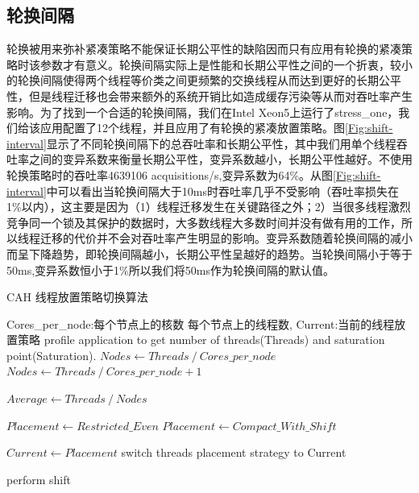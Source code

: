 \subsection{轮换间隔}
轮换被用来弥补紧凑策略不能保证长期公平性的缺陷因而只有应用有轮换的紧凑策略时该参数才有意义。轮换间隔实际上是性能和长期公平性之间的一个折衷，较小的轮换间隔使得两个线程等价类之间更频繁的交换线程从而达到更好的长期公平性，但是线程迁移也会带来额外的系统开销比如造成缓存污染等从而对吞吐率产生影响。为了找到一个合适的轮换间隔，我们在Intel Xeon5上运行了stress\_one，我们给该应用配置了12个线程，并且应用了有轮换的紧凑放置策略。图\ref{Fig:shift-interval}显示了不同轮换间隔下的总吞吐率和长期公平性，其中我们用单个线程吞吐率之间的变异系数来衡量长期公平性，变异系数越小，长期公平性越好。不使用轮换策略时的吞吐率4639106 acquisitions/s,变异系数为64\%。从图\ref{Fig:shift-interval}中可以看出当轮换间隔大于10ms时吞吐率几乎不受影响（吞吐率损失在1\%以内），这主要是因为（1）线程迁移发生在关键路径之外；2）当很多线程激烈竞争同一个锁及其保护的数据时，大多数线程大多数时间并没有做有用的工作，所以线程迁移的代价并不会对吞吐率产生明显的影响。变异系数随着轮换间隔的减小而呈下降趋势，即轮换间隔越小，长期公平性呈越好的趋势。当轮换间隔小于等于50ms,变异系数恒小于1\%所以我们将50ms作为轮换间隔的默认值。
\begin{algorithm}
\caption{CAH 线程放置策略切换算法}
\label{algo:mss}
\begin{algorithmic}[1] %
\Require Cores\_per\_node:每个节点上的核数 每个节点上的线程数, Current:当前的线程放置策略 %
\Repeat
{}
\State profile application to get number of threads(Threads) and saturation point(Saturation).
    \State $Nodes \gets Threads\  / \ Cores\_per\_node$
\Else
    \State $Nodes \gets Threads\  / \ Cores\_per\_node + 1$
\EndIf

\State $Average \gets Threads\  / \ Nodes$

    \State $Placement \gets Restricted\_Even$
\Else
    \State $Placement \gets Compact\_With\_Shift$
\EndIf

    \State $Current \gets Placement$
    \State switch threads placement strategy to Current 
\EndIf

    \State perform shift
\EndIf

\end{algorithmic}
\end{algorithm}

